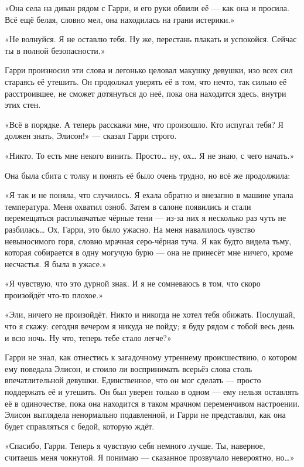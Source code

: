 \documentclass[a5paper, 9pt,
final, openany, twoside=true]{memoir}
\begin{document}
«Она села на диван рядом с Гарри, и его руки обвили её — как она и просила. Всё ещё белая, словно мел, она находилась на грани истерики.»

«Не волнуйся. Я не оставлю тебя. Ну же, перестань плакать и успокойся. Сейчас ты в полной безопасности.»

Гарри произносил эти слова и легонько целовал макушку девушки, изо всех сил стараясь её утешить. Он продолжал уверять её в том, что нечто, так сильно её расстроившее, не сможет дотянуться до неё, пока она находится здесь, внутри этих стен.

«Всё в порядке. А теперь расскажи мне, что произошло. Кто испугал тебя? Я должен знать, Элисон!» — сказал Гарри строго.

«Никто. То есть мне некого винить. Просто… ну, ох… Я не знаю, с чего начать.»

Она была сбита с толку и понять её было очень трудно, но всё же продолжила:

«Я так и не поняла, что случилось. Я ехала обратно и внезапно в машине упала температура. Меня охватил озноб. Затем в салоне появились и стали перемещаться расплывчатые чёрные тени — из-за них я несколько раз чуть не разбилась… Ох, Гарри, это было ужасно. На меня навалилось чувство невыносимого горя, словно мрачная серо-чёрная туча. Я как будто видела тьму, которая собирается в одну могучую бурю — она не принесёт мне ничего, кроме несчастья. Я была в ужасе.»

«Я чувствую, что это дурной знак. И я не сомневаюсь в том, что скоро произойдёт что-то плохое.»

«Эли, ничего не произойдёт. Никто и никогда не хотел тебя обижать. Послушай, что я скажу: сегодня вечером я никуда не пойду; я буду рядом с тобой весь день и всю ночь. Ну что, теперь тебе стало легче?»\bigskip

Гарри не знал, как отнестись к загадочному утреннему происшествию, о котором ему поведала Элисон, и стоило ли воспринимать всерьёз слова столь впечатлительной девушки. Единственное, что он мог сделать — просто поддержать её и утешить. Он был уверен только в одном — ему нельзя оставлять её в одиночестве, пока она находится в таком мрачном переменчивом настроении. Элисон выглядела ненормально подавленной, и Гарри не представлял, как она будет справляться с бедой, которую ждёт.

«Спасибо, Гарри. Теперь я чувствую себя немного лучше. Ты, наверное, считаешь меня чокнутой. Я понимаю — сказанное прозвучало невероятно, но…»
\end{document}

